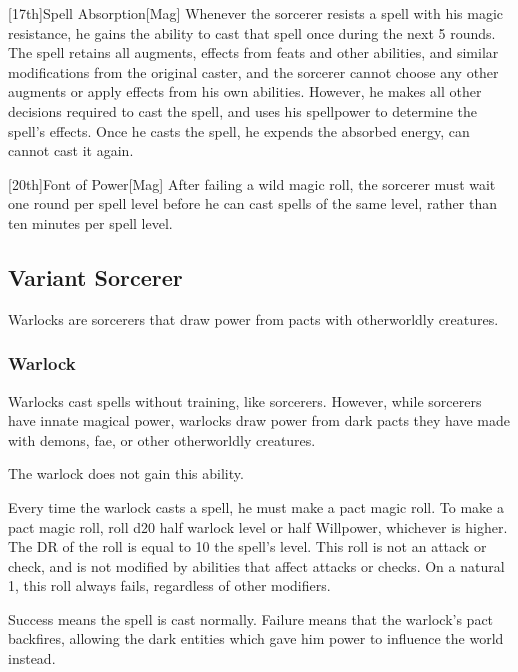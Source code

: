         [17th]{Spell Absorption}[Mag]
        Whenever the sorcerer resists a spell with his magic resistance, he gains the ability to cast that spell once during the next 5 rounds.
        The spell retains all augments, effects from feats and other abilities, and similar modifications from the original caster, and the sorcerer cannot choose any other augments or apply effects from his own abilities.
        However, he makes all other decisions required to cast the spell, and uses his spellpower to determine the spell's effects.
        Once he casts the spell, he expends the absorbed energy, can cannot cast it again.

        [20th]{Font of Power}[Mag]
        After failing a wild magic roll, the sorcerer must wait one round per spell level before he can cast spells of the same level, rather than ten minutes per spell level.

    \subsection{Variant Sorcerer}

        Warlocks are sorcerers that draw power from pacts with otherworldly creatures.

        \subsubsection{Warlock}

            Warlocks cast spells without training, like sorcerers.
            However, while sorcerers have innate magical power, warlocks draw power from dark pacts they have made with demons, fae, or other otherworldly creatures.

             The warlock does not gain this ability.

             Every time the warlock casts a spell, he must make a pact magic roll.
            To make a pact magic roll, roll d20 \add half warlock level or half Willpower, whichever is higher.
            The DR of the roll is equal to 10 \add the spell's level.
            This roll is not an attack or check, and is not modified by abilities that affect attacks or checks.
            On a natural 1, this roll always fails, regardless of other modifiers.

            Success means the spell is cast normally.
            Failure means that the warlock's pact backfires, allowing the dark entities which gave him power to influence the world instead.


